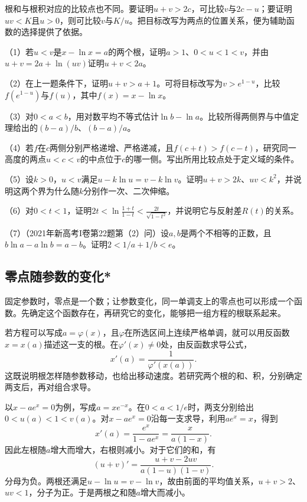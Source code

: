 根和与根积对应的比较点也不同。要证明\(u+v>2c\)，可比较\(v\)与\(2c-u\)；要证明\(uv<K\)且\(u>0\)，则可比较\(v\)与\(K/u\)。把目标改写为两点的位置关系，便为辅助函数的选择提供了依据。

\begin{exercise}
\mbox{}\par\nobreak

（1）若\(u<v\)是\(x-\ln x=a\)的两个根，证明\(a>1\)、\(0<u<1<v\)，并由\(u+v=2a+\ln(uv)\)证明\(u+v<2a\)。

（2）在上一题条件下，证明\(u+v>a+1\)。可将目标改写为\(v>e^{1-u}\)，比较\(f(e^{1-u})\)与\(f(u)\)，其中\(f(x)=x-\ln x\)。

（3）对\(0<a<b\)，用对数平均不等式估计\(\ln b-\ln a\)。比较所得两侧界与中值定理给出的\((b-a)/b\)、\((b-a)/a\)。

（4）若\(f\)在\(c\)两侧分别严格递增、严格递减，且\(f(c+t)>f(c-t)\)，研究同一高度的两点\(u<c<v\)的中点位于\(c\)的哪一侧。写出所用比较点处于定义域的条件。

（5）设\(k>0\)，\(u<v\)满足\(u-k\ln u=v-k\ln v\)。证明\(u+v>2k\)、\(uv<k^2\)，并说明这两个界为什么随\(k\)分别作一次、二次伸缩。

（6）对\(0<t<1\)，证明\(2t<\ln\frac{1+t}{1-t}<\frac{2t}{\sqrt{1-t^2}}\)，并说明它与反射差\(R(t)\)的关系。

（7）（2021年新高考I卷第22题第（2）问）设\(a,b\)是两个不相等的正数，且\(b\ln a-a\ln b=a-b\)。证明\(2<1/a+1/b<e\)。
\end{exercise}

\endgroup
\FloatBarrier
\newpage
\subsection{零点随参数的变化*}

固定参数时，零点是一个数；让参数变化，同一单调支上的零点也可以形成一个函数。先确定这个函数存在，再研究它的变化，能够把一组方程的根联系起来。

若方程可以写成\(a=\varphi(x)\)，且\(\varphi\)在所选区间上连续严格单调，就可以用反函数\(x=x(a)\)描述这一支的根。在\(\varphi'(x)\ne0\)处，由反函数求导公式，
\begin{equation*}
 x'(a)=\frac1{\varphi'(x(a))}.
\end{equation*}
这既说明根怎样随参数移动，也给出移动速度。若研究两个根的和、积，分别确定两支后，再对组合求导。

以\(x-ae^x=0\)为例，写成\(a=xe^{-x}\)。在\(0<a<1/e\)时，两支分别给出\(0<u(a)<1<v(a)\)。对\(x-ae^x=0\)沿每一支求导，利用\(ae^x=x\)，得到
\begin{equation*}
 x'(a)=\frac{e^x}{1-ae^x}=\frac{x}{a(1-x)}.
\end{equation*}
因此左根随\(a\)增大而增大，右根则减小。对于它们的和，有
\begin{equation*}
 (u+v)'=\frac{u+v-2uv}{a(1-u)(1-v)}.
\end{equation*}
分母为负。两根还满足\(u-\ln u=v-\ln v\)，故由前面的平均值关系，\(u+v>2\)、\(uv<1\)，分子为正。于是两根之和随\(a\)增大而减小。

